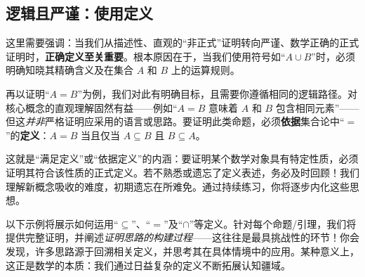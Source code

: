 \subsection{逻辑且严谨：使用定义}

这里需要强调：当我们从描述性、直观的``非正式''证明转向严谨、数学正确的正式证明时，\textbf{正确定义至关重要}。根本原因在于，当我们使用符号如``$A \cup B$''时，必须明确知晓其精确含义及在集合 $A$ 和 $B$ 上的运算规则。

再以证明``$A = B$''为例，我们对此有明确目标，且需要你遵循相同的逻辑路径。对核心概念的直观理解固然有益——例如``$A = B$ 意味着 $A$ 和 $B$ 包含相同元素''——但这\emph{并非}严格证明应采用的语言或思路。要证明此类命题，必须\textbf{依据}集合论中``$=$''的\textbf{定义}：$A = B$ 当且仅当 $A \subseteq B$ 且 $B \subseteq A$。

这就是``满足定义''或``依据定义''的内涵：要证明某个数学对象具有特定性质，必须证明其符合该性质的正式定义。若不熟悉或遗忘了定义表述，务必及时回顾！我们理解新概念吸收的难度，初期遗忘在所难免。通过持续练习，你将逐步内化这些思想。

以下示例将展示如何运用``$\subseteq$''、``$=$''及``$\cap$''等定义。针对每个命题/引理，我们将提供完整证明，并阐述\emph{证明思路的构建过程}——这往往是最具挑战性的环节！你会发现，许多思路源于回溯相关定义，并思考其在具体情境中的应用。某种意义上，这正是数学的本质：我们通过日益复杂的定义不断拓展认知疆域。
